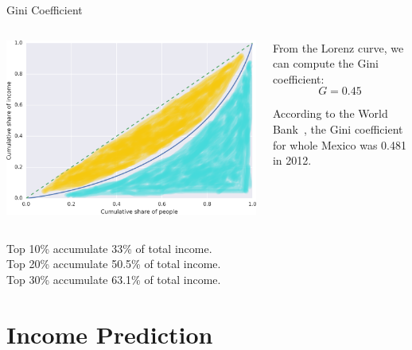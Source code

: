 \documentclass{beamer}
\begin{document}
\begin{frame}{Gini Coefficient}

\begin{columns}
\begin{column}{0.45\textwidth}

\includegraphics[width=\columnwidth]
{cumulative_income_gini.png}

\end{column}
\begin{column}{0.54\textwidth}

From the Lorenz curve, we can compute the Gini coefficient:
$$G = 0.45$$

According to the World Bank~\cite{world_bank}, the Gini coefficient for whole Mexico was \num{0.481} in 2012. 

\end{column}
\end{columns}
\medskip
\medskip

Top 10\% accumulate 33\%    of total income.\\
Top 20\% accumulate 50.5\%  of total income. \\
Top 30\% accumulate 63.1\%  of total income.

\end{frame}


\section{Income Prediction}
\end{document}
